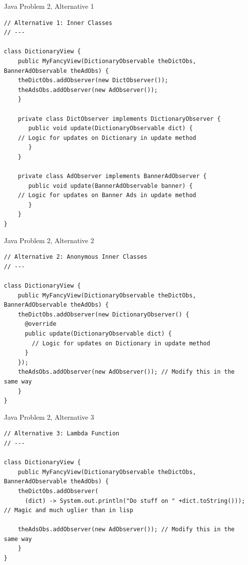 \documentclass[10pt,t,a4paper]{beamer}
\begin{document}
\begin{frame}[fragile,shrink=15,label={sec:orgheadline10}]{Java Problem 2, Alternative 1}
 \begin{verbatim}
// Alternative 1: Inner Classes
// ---

class DictionaryView {
    public MyFancyView(DictionaryObservable theDictObs, BannerAdObservable theAdObs) {
	theDictObs.addObserver(new DictObserver());
	theAdsObs.addObserver(new AdObserver());
    }

    private class DictObserver implements DictionaryObserver {
       public void update(DictionaryObservable dict) {
	// Logic for updates on Dictionary in update method
       }
    }

    private class AdObserver implements BannerAdObserver {
       public void update(BannerAdObservable banner) {
	// Logic for updates on Banner Ads in update method
       }
    }
}
\end{verbatim}
\end{frame}
\begin{frame}[fragile,shrink=20,label={sec:orgheadline11}]{Java Problem 2, Alternative 2}
 \begin{verbatim}
// Alternative 2: Anonymous Inner Classes
// ---

class DictionaryView {
    public MyFancyView(DictionaryObservable theDictObs, BannerAdObservable theAdObs) {
	theDictObs.addObserver(new DictionaryObserver() {
	  @override
	  public update(DictionaryObservable dict) {
	    // Logic for updates on Dictionary in update method
	  }
	});
	theAdsObs.addObserver(new AdObserver()); // Modify this in the same way
    }
}
\end{verbatim}
\end{frame}
\begin{frame}[fragile,shrink=20,label={sec:orgheadline12}]{Java Problem 2, Alternative 3}
 \begin{verbatim}
// Alternative 3: Lambda Function
// ---

class DictionaryView {
    public MyFancyView(DictionaryObservable theDictObs, BannerAdObservable theAdObs) {
	theDictObs.addObserver(
	  (dict) -> System.out.println("Do stuff on " +dict.toString())); // Magic and much uglier than in lisp

	theAdsObs.addObserver(new AdObserver()); // Modify this in the same way
    }
}
\end{verbatim}
\end{frame}
\end{document}
